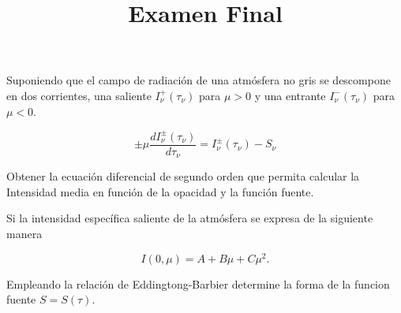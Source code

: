 \documentclass[10pt,spanish,a4paper]{practice}
\begin{document}
    \title{Examen Final}
    \maketitle

    \begin{problem}
        Suponiendo que el campo de radiación de una atmósfera no gris se descompone en dos corrientes, una saliente $I_{\nu}^{+}\left(\tau_{\nu}\right)$ para $\mu > 0$ y una entrante $I_{\nu}^{-}\left(\tau_{\nu}\right)$ para $\mu < 0$.

        $$
            \pm\mu\frac{d I_{\nu}^{\pm}\left(\tau_{\nu}\right)}{d \tau_{\nu}} = I_{\nu}^{\pm}\left(\tau_{\nu}\right) - S_{\nu}
        $$

        Obtener la ecuación diferencial de segundo orden que permita calcular la Intensidad media en función de la opacidad y la función fuente.
    \end{problem}

    \begin{problem}
        Si la intensidad específica saliente de la atmósfera se  expresa de la siguiente manera

        $$
            I\left(0, \mu\right) = A + B \mu + C \mu^2.
        $$

        Empleando la relación de Eddingtong-Barbier determine la forma de la funcion fuente $S=S\left(\tau\right)$.
    \end{problem}
\end{document}
